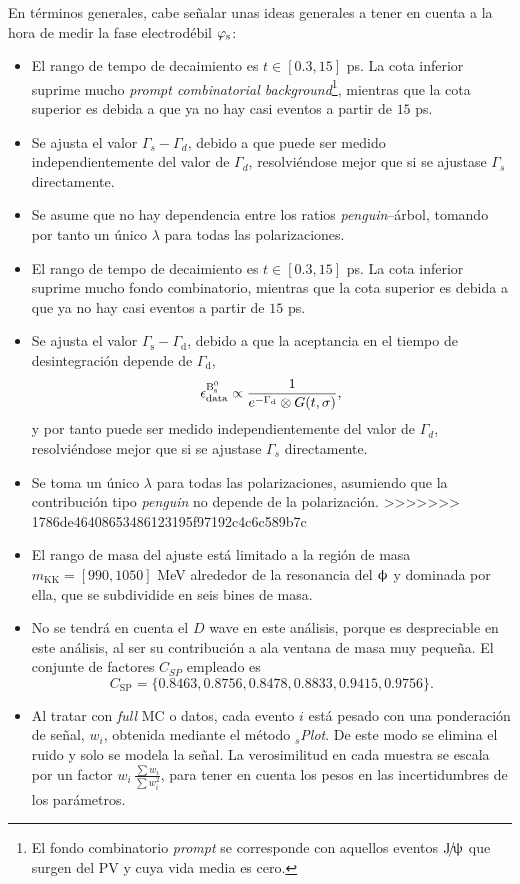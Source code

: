 En términos generales, cabe señalar unas ideas generales a tener en cuenta a la hora de medir la fase electrodébil $\varphi_{\text{s}}$:
\begin{itemize}
    \item El rango de tempo de decaimiento es $t\in[0.3,15]$ ps. La cota inferior suprime mucho \emph{prompt combinatorial background}\footnote{El fondo combinatorio \emph{prompt} se corresponde con aquellos eventos $\text{J}\!/\!\uppsi$ que surgen del PV y cuya vida media es cero.}, mientras que la cota superior es debida a que ya no hay casi eventos a partir de $15$ ps.
  \item Se ajusta el valor $\Gamma_s - \Gamma_d$, debido a que puede ser medido independientemente del valor de $\Gamma_d$, resolviéndose mejor que si se ajustase $\Gamma_s$ directamente.
  \item Se asume que no hay dependencia entre los ratios \textit{penguin}--árbol, tomando por tanto un único $\lambda$ para todas las polarizaciones.
  \item El rango de tempo de decaimiento es $t\in[0.3,15]$ ps. La cota inferior suprime mucho fondo combinatorio, mientras que la cota superior es debida a que ya no hay casi eventos a partir de $15$ ps.
  \item Se ajusta el valor $\Gamma_{\text{s}} - \Gamma_{\text{d}}$, debido a que la aceptancia en el tiempo de desintegración depende de $\Gamma_{\text{d}}$, $$\epsilon_{\text{data}}^{\text{B}{}_{\text{s}}^{\text{0}}} \propto \frac{1}{e^{-\Gamma_{\text{d}}} \otimes G(t,\sigma)},$$ y por tanto puede ser medido independientemente del valor de $\Gamma_d$, resolviéndose mejor que si se ajustase $\Gamma_s$ directamente.
  \item Se toma un único $\lambda$ para todas las polarizaciones, asumiendo que la contribución tipo \emph{penguin} no depende de la polarización.
>>>>>>> 1786de46408653486123195f97192c4c6c589b7c
  \item El rango de masa del ajuste está limitado a la región de masa $m_{\text{KK}} = [990,1050]$ MeV alrededor de la resonancia del $\upphi$ y dominada por ella, que se subdividide en seis bines de masa.
  \item No se tendrá en cuenta el $D$ wave en este análisis, porque es despreciable en este análisis, al ser su contribución a ala ventana de masa muy pequeña. El conjunte de factores $C_{SP}$ empleado es $$ C_{\text{SP}}  = \{0.8463,0.8756,0.8478,0.8833,0.9415,0.9756\}.$$
  \item Al tratar con \emph{full} MC o datos, cada evento $i$ está pesado con una ponderación de señal, $w_i$, obtenida mediante el método ${}_s$\textit{Plot}. De este modo se elimina el ruido y solo se modela la señal. La verosimilitud en cada muestra se escala por un factor $w_i \,\frac{\sum w_i}{\sum w_i^2}$, para tener en cuenta los pesos en las incertidumbres de los parámetros.
\end{itemize}





